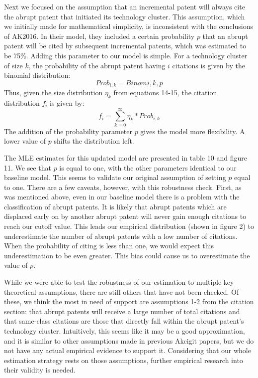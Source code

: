 \documentclass[letterpaper,12pt]{article}
\theoremstyle{definition}
\begin{document}
Next we focused on the assumption that an incremental patent will always cite the abrupt patent that initiated its technology cluster. This assumption, which we initially made for mathematical simplicity, is inconsistent with the conclusions of AK2016. In their model, they included a certain probability $p$ that an abrupt patent will be cited by subsequent incremental patents, which was estimated to be 75\%. Adding this parameter to our model is simple. For a technology cluster of size $k$, the probability of the abrupt patent having $i$ citations is given by the binomial distribution:
\begin{equation} \label{eq:prob}
Prob_{i, k} = Binom{i, k, p}
\end{equation}
Thus, given the size distribution $\eta_k$ from equations 14-15, the citation distribution $f_i$ is given by:
\begin{equation} \label{eq:cit_dist}
f_i = \displaystyle\sum_{k=0}^{\infty}\eta_k * Prob_{i, k}
\end{equation}
The addition of the probability parameter $p$ gives the model more flexibility. A lower value of $p$ shifts the distribution left.

The MLE estimates for this updated model are presented in table 10 and figure 11. We see that $p$ is equal to one, with the other parameters identical to our baseline model. This seems to validate our original assumption of setting $p$ equal to one. There are a few caveats, however, with this robustness check. First, as was mentioned above, even in our baseline model there is a problem with the classification of abrupt patents. It is likely that abrupt patents which are displaced early on by another abrupt patent will never gain enough citations to reach our cutoff value. This leads our empirical distribution (shown in figure 2) to underestimate the number of abrupt patents with a low number of citations. When the probability of citing is less than one, we would expect this underestimation to be even greater. This bias could cause us to overestimate the value of $p$.

While we were able to test the robustness of our estimation to multiple key theoretical assumptions, there are still others that have not been checked. Of these, we think the most in need of support are assumptions 1-2 from the citation section: that abrupt patents will receive a large number of total citations and that same-class citations are those that directly fall within the abrupt patent’s technology cluster. Intuitively, this seems like it may be a good approximation, and it is similar to other assumptions made in previous Akcigit papers, but we do not have any actual empirical evidence to support it. Considering that our whole estimation strategy rests on those assumptions, further empirical research into their validity is needed.
\end{document}
